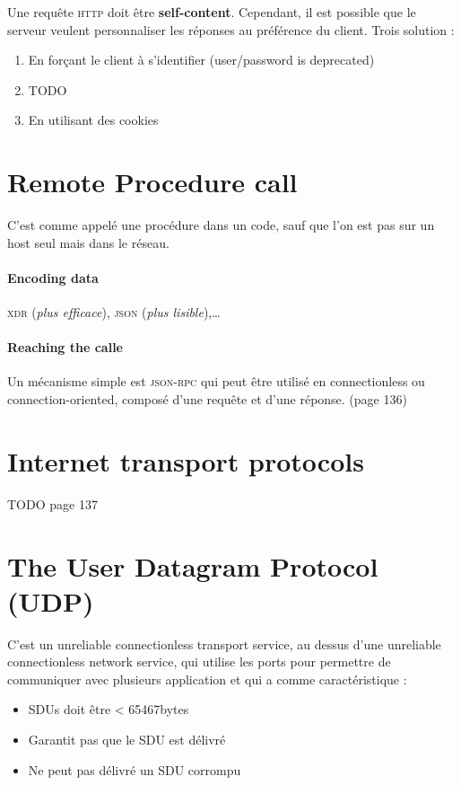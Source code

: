 \documentclass{report}
\begin{document}
Une requête \textsc{http} doit être \textbf{self-content}. Cependant, il est possible que
le serveur veulent personnaliser les réponses au préférence du client. Trois solution :
\begin{enumerate}
    \item En forçant le client à s'identifier (user/password is deprecated)
    \item TODO
    \item En utilisant des cookies
\end{enumerate}

\section{Remote Procedure call}
C'est comme appelé une procédure dans un code, sauf que l'on est pas sur
un host seul mais dans le réseau.

\paragraph{Encoding data}
\textsc{xdr} (\textit{plus efficace}), \textsc{json} (\textit{plus lisible}),\ldots

\paragraph{Reaching the calle}
Un mécanisme simple est \textsc{json-rpc} qui peut être utilisé en connectionless ou
connection-oriented, composé d'une requête et d'une réponse. (page 136)

\section{Internet transport protocols}
TODO page 137

\section{The User Datagram Protocol (UDP)}

C'est un unreliable connectionless transport service, au dessus d'une unreliable
connectionless network service, qui utilise les ports
pour permettre de communiquer avec plusieurs application et qui a comme
caractéristique :
\begin{itemize}
    \item SDUs doit être < 65467bytes
    \item Garantit pas que le SDU est délivré
    \item Ne peut pas délivré un SDU corrompu
\end{itemize}
\end{document}
